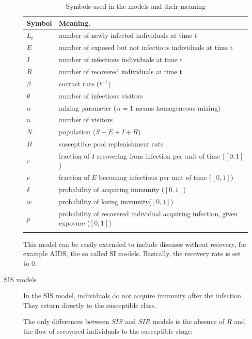 \begin{description}
\begin{table}[h]
\caption{\small  Symbols used in the models and their meaning}
\begin{center}
\begin{tabular}{l l}
\hline\hline 
\textbf{Symbol}	&\textbf{Meaning}. \\ \hline	
$L_t$		& number of newly infected individuals at time t\\	
$E$		& number of exposed but not infectious individuals at time t\\
$I$		& number of infectious individuals at time t\\
$R$		& number of recovered individuals at time t\\
$\beta$		& contact rate ($t^{-1}$)\\
$\theta$	& number of infectious visitors\\
$\alpha$	& mixing parameter ($\alpha = 1$ means homogeneous mixing) \\
$n$		& number of visitors\\
$N$		& population ($S+E+I+R$)\\
$B$		& susceptible pool replenishment rate\\
$r$		& fraction of $I$ recovering from infection per unit of time ($[0,1]$)\\
$e$		& fraction of $E$ becoming infectious per unit of time ($[0,1]$)\\
$\delta$	& probability of acquiring immunity ($[0,1]$)\\
$w$		& probability of losing immunity($[0,1]$)\\ 
$p$		& probability of recovered individual acquiring infection, given exposure ($[0,1]$)\\\hline
\hline\hline
\label{Table:symbols}
\end{tabular}
\end{center}
\end{table} 

This model can be easily extended to include diseases without recovery, for example AIDS, the so called SI models. Basically, the recovery rate is set to 0.

\item[SIS models]
In the SIS model, individuals do not acquire immunity after the infection. They return directly to the susceptible class.

The only differences between $SIS$ and $SIR$ models is the absence of $R$ and the flow of recovered individuals to the susceptible stage: 


\end{description}
